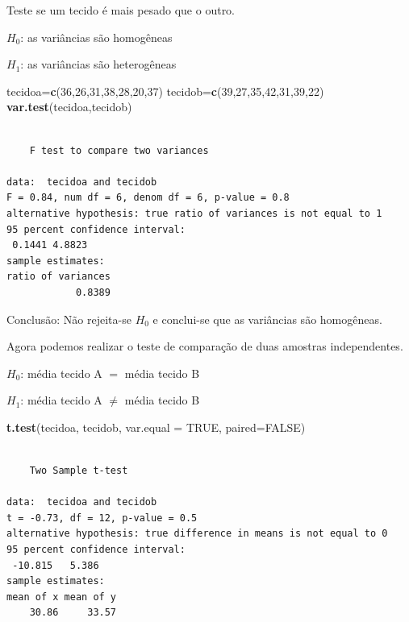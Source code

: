 \documentclass[12pt,brazil,oneside]{book}
\newenvironment{Shaded}{\begin{snugshade}}{\end{snugshade}}
\newcommand{\DataTypeTok}[1]{\textcolor[rgb]{0.13,0.29,0.53}{#1}}
\newcommand{\DecValTok}[1]{\textcolor[rgb]{0.00,0.00,0.81}{#1}}
\newcommand{\KeywordTok}[1]{\textcolor[rgb]{0.13,0.29,0.53}{\textbf{#1}}}
\newcommand{\NormalTok}[1]{#1}
\newcommand{\OtherTok}[1]{\textcolor[rgb]{0.56,0.35,0.01}{#1}}
\begin{document}
Teste se um tecido é mais pesado que o outro.

\textbf{\(H_0\)}: as variâncias são homogêneas

\textbf{\(H_1\)}: as variâncias são heterogêneas

\begin{Shaded}
\begin{Highlighting}[]
\NormalTok{tecidoa=}\KeywordTok{c}\NormalTok{(}\DecValTok{36}\NormalTok{,}\DecValTok{26}\NormalTok{,}\DecValTok{31}\NormalTok{,}\DecValTok{38}\NormalTok{,}\DecValTok{28}\NormalTok{,}\DecValTok{20}\NormalTok{,}\DecValTok{37}\NormalTok{)}
\NormalTok{tecidob=}\KeywordTok{c}\NormalTok{(}\DecValTok{39}\NormalTok{,}\DecValTok{27}\NormalTok{,}\DecValTok{35}\NormalTok{,}\DecValTok{42}\NormalTok{,}\DecValTok{31}\NormalTok{,}\DecValTok{39}\NormalTok{,}\DecValTok{22}\NormalTok{)}
\KeywordTok{var.test}\NormalTok{(tecidoa,tecidob)}
\end{Highlighting}
\end{Shaded}

\begin{verbatim}

    F test to compare two variances

data:  tecidoa and tecidob
F = 0.84, num df = 6, denom df = 6, p-value = 0.8
alternative hypothesis: true ratio of variances is not equal to 1
95 percent confidence interval:
 0.1441 4.8823
sample estimates:
ratio of variances 
            0.8389 
\end{verbatim}

Conclusão: Não rejeita-se \(H_0\) e conclui-se que as variâncias são homogêneas.

Agora podemos realizar o teste de comparação de duas amostras independentes.

\textbf{\(H_0\)}: média tecido A \(=\) média tecido B

\textbf{\(H_1\)}: média tecido A \(\neq\) média tecido B

\begin{Shaded}
\begin{Highlighting}[]
\KeywordTok{t.test}\NormalTok{(tecidoa, tecidob, }\DataTypeTok{var.equal =} \OtherTok{TRUE}\NormalTok{, }\DataTypeTok{paired=}\OtherTok{FALSE}\NormalTok{)}
\end{Highlighting}
\end{Shaded}

\begin{verbatim}

    Two Sample t-test

data:  tecidoa and tecidob
t = -0.73, df = 12, p-value = 0.5
alternative hypothesis: true difference in means is not equal to 0
95 percent confidence interval:
 -10.815   5.386
sample estimates:
mean of x mean of y 
    30.86     33.57 
\end{verbatim}
\end{document}
